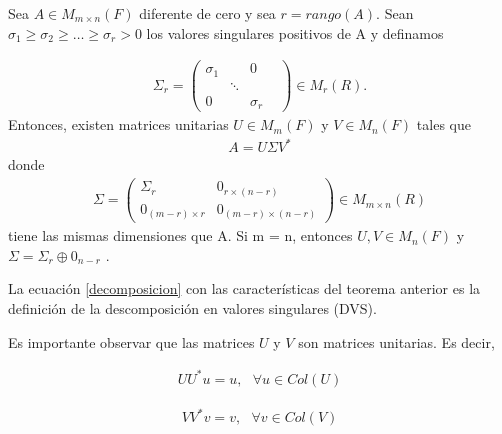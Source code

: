 \begin{theorem}
Sea $A \in M_{m \times n} (F)$ diferente de cero y sea $r =   rango(A)$. Sean $\sigma_1 \geq \sigma_2 \geq \dots \geq \sigma_r > 0$ los valores singulares positivos de A y definamos

\begin{equation*}
    \begin{aligned}
    \Sigma_r = 
    \begin{pmatrix}
    \sigma_1 & & 0 \\
     & \ddots & & \\
     0 & & \sigma_r
    \end{pmatrix}
    \in M_{r}(R).
    \end{aligned}
\end{equation*}
Entonces, existen matrices unitarias $U \in M_{m}(F)$ y $V \in M_{n}(F)$ tales que 
\begin{equation} \label{decomposicion}
    \begin{aligned}
    A = U \Sigma V^{*}
    \end{aligned}
\end{equation}
donde
\begin{equation*}
    \begin{aligned}
    \Sigma = 
    \begin{pmatrix}
    \Sigma_r & 0_{r \times (n-r)} \\
    0_{(m-r) \times r} & 0_{(m-r) \times (n-r)}
    \end{pmatrix}
    \in M_{m \times n}(R)
    \end{aligned}
\end{equation*}
 tiene las mismas dimensiones que A. Si m = n, entonces $U, V \in M_{n}(F)$ y $\Sigma = \Sigma_r \oplus 0_{n-r}$
 \cite[p.~421]{garcia2017second}.
\end{theorem}

La ecuación \ref{decomposicion} con las características del teorema anterior es la definición de la descomposición en valores singulares (DVS). 


Es importante observar que las matrices $U$ y $V$ son matrices unitarias. Es decir, 

\begin{equation*}
    \begin{aligned}
    U U^{*} u = u, \text{ } \forall u \in Col (U)
    \end{aligned}
\end{equation*}

\begin{equation*}
    \begin{aligned}
    V V^{*} v = v, \text{ } \forall v \in Col (V)
    \end{aligned}
\end{equation*}

